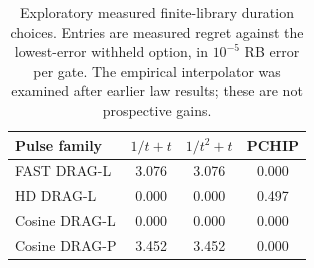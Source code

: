 \begin{table}[t]
\centering\caption{Exploratory measured finite-library duration choices. Entries are measured regret against the lowest-error withheld option, in $10^{-5}$ RB error per gate. The empirical interpolator was examined after earlier law results; these are not prospective gains.}\label{tab:choice_audit}
\begin{tabular}{lccc}\hline
Pulse family & $1/t+t$ & $1/t^2+t$ & PCHIP\\\hline
FAST DRAG-L & 3.076 & 3.076 & 0.000\\
HD DRAG-L & 0.000 & 0.000 & 0.497\\
Cosine DRAG-L & 0.000 & 0.000 & 0.000\\
Cosine DRAG-P & 3.452 & 3.452 & 0.000\\
\hline\end{tabular}
\end{table}
